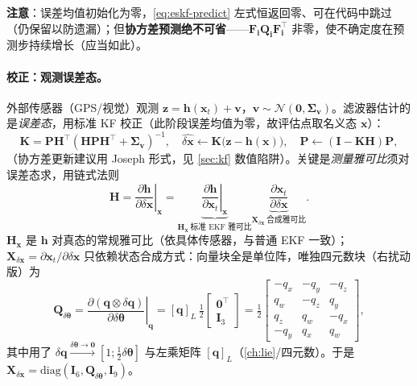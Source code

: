 \textbf{注意}：误差均值初始化为零，\cref{eq:eskf-predict} 左式恒返回零、可在代码中跳过（仍保留以防遗漏）；但\textbf{协方差预测绝不可省}——$\mathbf{F}_{\mathbf{i}}\mathbf{Q}_{\mathbf{i}}\mathbf{F}_{\mathbf{i}}^\top$ 非零，使不确定度在预测步持续增长（应当如此）\cite{sola2017quaternion}。

\paragraph{校正：观测误差态。}
外部传感器（GPS/视觉）观测 $\mathbf{z}=\mathbf{h}(\mathbf{x}_t)+\mathbf{v}$，$\mathbf{v}\sim\mathcal{N}(\mathbf{0},\boldsymbol{\Sigma}_{\mathbf{v}})$。滤波器估计的是\emph{误差态}，用标准 KF 校正（此阶段误差均值为零，故评估点取名义态 $\mathbf{x}$）：
\begin{equation}
  \mathbf{K}=\mathbf{P}\mathbf{H}^\top(\mathbf{H}\mathbf{P}\mathbf{H}^\top+\boldsymbol{\Sigma}_{\mathbf{v}})^{-1},\quad
  \widehat{\delta\mathbf{x}}\leftarrow\mathbf{K}\big(\mathbf{z}-\mathbf{h}(\mathbf{x})\big),\quad
  \mathbf{P}\leftarrow(\mathbf{I}-\mathbf{K}\mathbf{H})\mathbf{P},
  \label{eq:eskf-correct}
\end{equation}
（协方差更新建议用 Joseph 形式，见 \cref{sec:kf} 数值陷阱）。关键是\emph{测量雅可比}须对误差态求，用链式法则
\begin{equation}
  \mathbf{H}=\left.\frac{\partial\mathbf{h}}{\partial\delta\mathbf{x}}\right|_{\mathbf{x}}
  =\underbrace{\left.\frac{\partial\mathbf{h}}{\partial\mathbf{x}_t}\right|_{\mathbf{x}}}_{\mathbf{H}_{\mathbf{x}}\ \text{标准 EKF 雅可比}}
  \underbrace{\frac{\partial\mathbf{x}_t}{\partial\delta\mathbf{x}}}_{\mathbf{X}_{\delta\mathbf{x}}\ \text{合成雅可比}}.
  \label{eq:eskf-H}
\end{equation}
$\mathbf{H}_{\mathbf{x}}$ 是 $\mathbf{h}$ 对真态的常规雅可比（依具体传感器，与普通 EKF 一致）；$\mathbf{X}_{\delta\mathbf{x}}=\partial\mathbf{x}_t/\partial\delta\mathbf{x}$ 只依赖状态合成方式：向量块全是单位阵，唯独四元数块（右扰动版）为
\begin{equation}
  \mathbf{Q}_{\delta\boldsymbol{\theta}}=\left.\frac{\partial(\mathbf{q}\otimes\delta\mathbf{q})}{\partial\delta\boldsymbol{\theta}}\right|_{\mathbf{q}}
  =[\mathbf{q}]_L\,\tfrac12\begin{bmatrix}\mathbf{0}^\top\\\mathbf{I}_3\end{bmatrix}
  =\tfrac12\begin{bmatrix}-q_x&-q_y&-q_z\\ q_w&-q_z&q_y\\ q_z&q_w&-q_x\\ -q_y&q_x&q_w\end{bmatrix},
  \label{eq:eskf-Qdtheta}
\end{equation}
其中用了 $\delta\mathbf{q}\xrightarrow{\delta\boldsymbol{\theta}\to\mathbf{0}}[1;\tfrac12\delta\boldsymbol{\theta}]$ 与左乘矩阵 $[\mathbf{q}]_L$（\cref{ch:lie}/四元数）。于是 $\mathbf{X}_{\delta\mathbf{x}}=\mathrm{diag}(\mathbf{I}_6,\mathbf{Q}_{\delta\boldsymbol{\theta}},\mathbf{I}_9)$。

